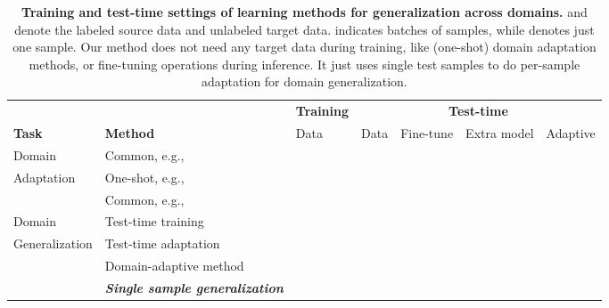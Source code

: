 \documentclass{article} \usepackage[table]{xcolor}
\begin{document}
\begin{table}[t]
\small
\vspace{-4mm}
\centering
\caption{
\textbf{Training and test-time settings of learning methods for generalization across domains.}  and  denote the labeled source data and unlabeled target data.  indicates batches of samples, while  denotes just one sample. 
Our method does not need any target data during training, like (one-shot) domain adaptation methods, or fine-tuning operations during inference. It just uses single test samples to do per-sample adaptation for domain generalization. 
}
\vspace{-2mm}
\begin{adjustbox}{max width =\textwidth}
\begin{tabular}{llllccc}
\toprule
& & \textbf{Training} & \multicolumn{4}{c}{\textbf{Test-time}} \\
\cmidrule(lr){3-3} 
\cmidrule(lr){4-7}
\textbf{Task} & \textbf{Method} & Data & Data & Fine-tune & Extra model & Adaptive   \\ \midrule
Domain & Common, e.g.,~\citep{long2015learning} &   &  &  &  & \\
Adaptation & One-shot, e.g.,~\citep{luo2020adversarial} &  &  &  &  &  \\
\midrule
 & Common, e.g.,~\citep{seo2020learning} &  &  &  &  & \\
Domain & Test-time training \citep{sun2020test} &  &  &  &  & \\
Generalization & Test-time adaptation \citep{wang2021tent} &  &  &  &  & \\
 & Domain-adaptive method \citep{dubey2021adaptive} &  &  &  &  &  \\
& \textit{\textbf{Single sample generalization}} &  &  &  &  &  \\
\bottomrule
\end{tabular}
\end{adjustbox}
\vspace{-2mm}
\label{settings}
\vspace{-4mm}
\end{table}
\end{document}
